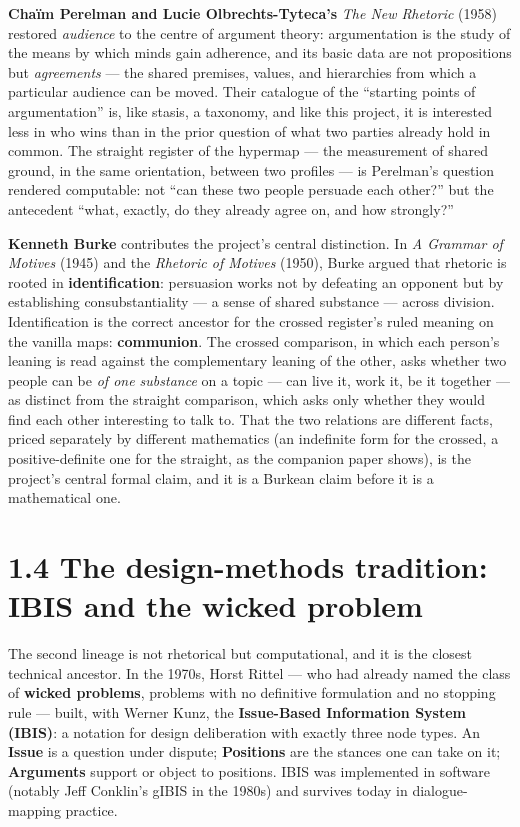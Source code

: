 \textbf{Chaïm Perelman and Lucie Olbrechts-Tyteca's} \emph{The New
Rhetoric} (1958) restored \emph{audience} to the centre of argument
theory: argumentation is the study of the means by which minds gain
adherence, and its basic data are not propositions but \emph{agreements}
--- the shared premises, values, and hierarchies from which a particular
audience can be moved. Their catalogue of the ``starting points of
argumentation'' is, like stasis, a taxonomy, and like this project, it
is interested less in who wins than in the prior question of what two
parties already hold in common. The straight register of the hypermap
--- the measurement of shared ground, in the same orientation, between
two profiles --- is Perelman's question rendered computable: not ``can
these two people persuade each other?'' but the antecedent ``what,
exactly, do they already agree on, and how strongly?''

\textbf{Kenneth Burke} contributes the project's central distinction. In
\emph{A Grammar of Motives} (1945) and the \emph{Rhetoric of Motives}
(1950), Burke argued that rhetoric is rooted in \textbf{identification}:
persuasion works not by defeating an opponent but by establishing
consubstantiality --- a sense of shared substance --- across division.
Identification is the correct ancestor for the crossed register's ruled
meaning on the vanilla maps: \textbf{communion}. The crossed comparison,
in which each person's leaning is read against the complementary leaning
of the other, asks whether two people can be \emph{of one substance} on
a topic --- can live it, work it, be it together --- as distinct from
the straight comparison, which asks only whether they would find each
other interesting to talk to. That the two relations are different
facts, priced separately by different mathematics (an indefinite form
for the crossed, a positive-definite one for the straight, as the
companion paper shows), is the project's central formal claim, and it is
a Burkean claim before it is a mathematical one.

\section{1.4 The design-methods tradition: IBIS and the wicked
problem}\label{the-design-methods-tradition-ibis-and-the-wicked-problem}

The second lineage is not rhetorical but computational, and it is the
closest technical ancestor. In the 1970s, Horst Rittel --- who had
already named the class of \textbf{wicked problems}, problems with no
definitive formulation and no stopping rule --- built, with Werner Kunz,
the \textbf{Issue-Based Information System (IBIS)}: a notation for
design deliberation with exactly three node types. An \textbf{Issue} is
a question under dispute; \textbf{Positions} are the stances one can
take on it; \textbf{Arguments} support or object to positions. IBIS was
implemented in software (notably Jeff Conklin's gIBIS in the 1980s) and
survives today in dialogue-mapping practice.

